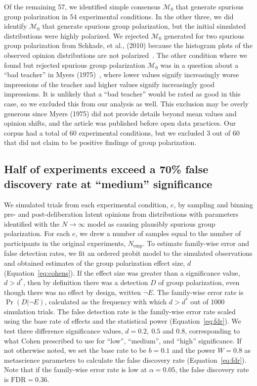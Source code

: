 \documentclass[preview]{article}
\newcommand{\fdr}{\mathrm{FDR}}
\newcommand{\nullmodel}{\mathcal{M}_0}
\begin{document}
Of the remaining 57, we identified simple consensus $\nullmodel$ that generate spurious
group polarization in 54 experimental conditions. In the other three, we did
identify $\nullmodel$ that generate spurious group polarization, but the initial
simulated distributions were highly polarized. 
We rejected $\nullmodel$ generated for
two spurious group polarization from Schkade, et al., (2010) because
the histogram plots of the observed opinion distributions are not
polarized~\cite[Figure 1, p. 234]{Schkade2010}. The other condition where we
found but rejected spurious group polarization $\nullmodel$ was in a question 
about a ``bad teacher'' in Myers (1975)~\cite{Myers1975a}, where lower values
signify increasingly worse impressions of the teacher and higher values signify
increasingly good impressions. It is unlikely that a
``bad teacher'' would be rated as good in this case, so we excluded this 
from our analysis as well. This exclusion may be overly generous since Myers (1975)
did not provide details beyond mean values and opinion shifts, and the article was
published before open data practices. Our corpus had a total of 60 experimental conditions, but we excluded 3 out of 60 
that did not claim to be positive findings of group polarization.



\subsection{Half of experiments exceed a 70\% false discovery rate at ``medium'' significance}

We simulated trials from each experimental condition, $e$, by sampling and binning
pre- and post-deliberation latent opinions from distributions with parameters
identified with the $N\to\infty$ model as causing plausibly spurious group
polarization. For each $e$, we drew a number of samples equal to the number of
participants in the original experiments, $N_\mathrm{emp}$. To estimate family-wise
error and false detection rates, we fit an ordered probit model to the simulated
observations and obtained estimates of the group polarization effect size, $d$
(Equation~\ref{eq:cohens}). If the effect size was greater than a significance
value, $d > d^*$, then by definition there was a detection $D$ of group
polarization, even though there was no effect by design, written $\neg E$.  The
family-wise error rate is $\Pr(D|\neg E)$, calculated as the frequency with which $d
> d^*$ out of 1000 simulation trials. The false detection rate is the family-wise
error rate scaled using the base rate of effects and the statistical power
(Equation~\ref{eq:fdr}). We test three difference significance values, $d =
0.2,~0.5$ and $0.8$, corresponding to what Cohen prescribed to use for ``low'',
``medium'', and ``high'' significance. If not otherwise noted, we set the base
rate to be $b=0.1$ and the power $W = 0.8$ as metascience parameters to calculate 
the false discovery rate (Equation~\ref{eq:fdr}). Note that if the family-wise error
rate is low at $\alpha = 0.05$, the false discovery rate is $\fdr = 0.36$.
\end{document}

